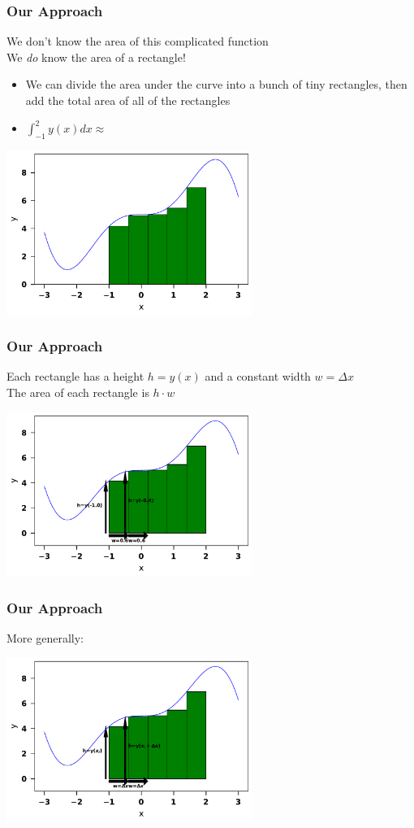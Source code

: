 \documentclass{beamer}
\begin{document}
	\begin{frame}
	\frametitle{Our Approach}
	We don't know the area of this complicated function\\
	We \textit{do} know the area of a rectangle!\\
	\begin{itemize}
		\item 	We can divide the area under the curve into a bunch of tiny rectangles, then add the total area of all of the rectangles
		\item $\int_{-1}^{2}y(x)dx\approx$
	\end{itemize}
	\begin{center}
		\includegraphics[width=8cm]{reimann_1.pdf}
	\end{center}
	\end{frame}


	\begin{frame}
	\frametitle{Our Approach}
	Each rectangle has a height $h=y(x)$ and a constant width $w=\Delta x$\\
	The area of each rectangle is $h\cdot w$
	\begin{center}
		\includegraphics[width=8cm]{reimann_2.pdf}
	\end{center}
	\end{frame}


	\begin{frame}
	\frametitle{Our Approach}
	More generally:
	\begin{center}
		\includegraphics[width=8cm]{reimann_3.pdf}
	\end{center}
	\end{frame}
\end{document}
